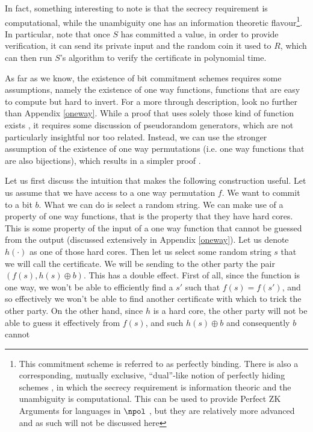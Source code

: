 \documentclass{article}
\begin{document}
In fact, something interesting to note is that the secrecy requirement is computational, while the unambiguity one has an information theoretic flavour\footnote{This commitment scheme is referred to as perfectly binding. There is also a corresponding, mutually exclusive, \enquote{dual}-like notion of perfectly hiding  schemes \cite{brassardMinimumDisclosureProofs1988}, in which the secrecy
    requirement is information theoric and the unambiguity is computational. This can be used to provide Perfect ZK Arguments for
    languages in $\npol$ \cite{naorPerfectZeroKnowledgeArguments1998}, but they are relatively more advanced and as such will not be discussed here}.
In particular, note that once $S$ has committed a value, in order to provide verification, it can send its private input and the random coin it used to $R$, which can then
run $S$'s algorithm to verify the certificate in polynomial time. \par
As far as we know, the existence of bit commitment schemes requires some assumptions, namely the existence of one way functions, functions that are easy to compute but hard to invert.
For a more through description, look no further than Appendix \ref{oneway}.
While a proof that uses solely those kind of function exists \cite{naorBitCommitmentUsing}, it requires some discussion of pseudorandom generators, which are not particularly insightful nor too related.
Instead, we can use the stronger assumption of the existence of one way permutations (i.e. one way functions that are also bijections), which results in a simpler proof \cite{blummanuelCoinFlippingTelephone1983}.\par
Let us first discuss the intuition that makes the following construction useful. Let us assume that we have access to a one way permutation $f$.
We want to commit to a bit $b$. What we can do is select a random string. We can make use of a property of one way functions, that is the
property that they have hard cores. This is some property of the input of a one way function that cannot be guessed from the output (discussed extensively in Appendix \ref{oneway}).
Let us denote $h(\cdot)$ as one of those hard cores. Then let us select some random string $s$ that we will call the certificate. We will be sending to
the other party the pair $(f(s), h(s) \oplus b)$. This has a double effect. First of all, since the function is one way, we won't be able to
efficiently find a $s'$ such that $f(s) = f(s')$, and so effectively we won't be able to find another certificate with which to trick the other party.
On the other hand, since $h$ is a hard core, the other party will not be able to guess it effectively from $f(s)$, and such $h(s) \oplus b$ and consequently $b$ cannot
\end{document}
